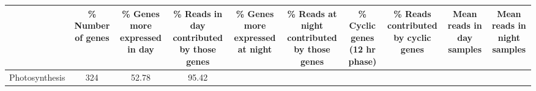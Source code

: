 \documentclass[]{article}
\begin{document}
\begin{longtable}[]{@{}lccccccccc@{}}
\toprule
\begin{minipage}[b]{0.07\columnwidth}\raggedright\strut
\strut
\end{minipage} & \begin{minipage}[b]{0.06\columnwidth}\centering\strut
\% Number of genes\strut
\end{minipage} & \begin{minipage}[b]{0.08\columnwidth}\centering\strut
\% Genes more expressed in day\strut
\end{minipage} & \begin{minipage}[b]{0.08\columnwidth}\centering\strut
\% Reads in day contributed by those genes\strut
\end{minipage} & \begin{minipage}[b]{0.08\columnwidth}\centering\strut
\% Genes more expressed at night\strut
\end{minipage} & \begin{minipage}[b]{0.08\columnwidth}\centering\strut
\% Reads at night contributed by those genes\strut
\end{minipage} & \begin{minipage}[b]{0.08\columnwidth}\centering\strut
\% Cyclic genes (12 hr phase)\strut
\end{minipage} & \begin{minipage}[b]{0.08\columnwidth}\centering\strut
\% Reads contributed by cyclic genes\strut
\end{minipage} & \begin{minipage}[b]{0.08\columnwidth}\centering\strut
Mean reads in day samples\strut
\end{minipage} & \begin{minipage}[b]{0.08\columnwidth}\centering\strut
Mean reads in night samples\strut
\end{minipage}\tabularnewline
\midrule
\endhead
\begin{minipage}[t]{0.07\columnwidth}\raggedright\strut
Photosynthesis\strut
\end{minipage} & \begin{minipage}[t]{0.06\columnwidth}\centering\strut
324\strut
\end{minipage} & \begin{minipage}[t]{0.08\columnwidth}\centering\strut
52.78\strut
\end{minipage} & \begin{minipage}[t]{0.08\columnwidth}\centering\strut
95.42\strut
\end{minipage} & \begin{minipage}[t]{0.08\columnwidth}\centering\strut

\end{minipage}
\end{longtable}
\end{document}
